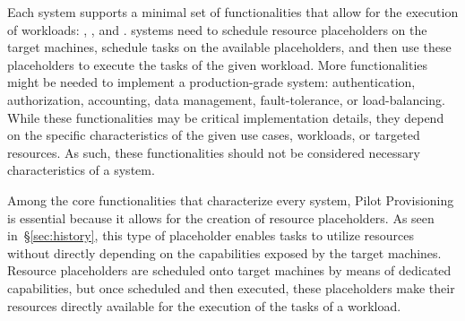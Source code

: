 \documentclass{sig-alternate}
\begin{document}
Each \pilotjob system supports a minimal set of functionalities that allow for
the execution of workloads: , , and . \pilotjob systems need to schedule
resource placeholders on the target machines, schedule tasks on the available
placeholders, and then use these placeholders to execute the tasks of the given
workload. More functionalities might be needed to implement a production-grade
\pilotjob system: authentication, authorization, accounting, data management,
fault-tolerance, or load-balancing. While these functionalities may be critical
implementation details, they depend on the specific characteristics of the given
use cases, workloads, or targeted resources. As such, these functionalities
should not be considered necessary characteristics of a \pilotjob system.

Among the core functionalities that characterize every \pilotjob system, Pilot
Provisioning is essential because it allows for the creation of resource
placeholders. As seen in~\S\ref{sec:history}, this type of placeholder enables
tasks to utilize resources without directly depending on the capabilities
exposed by the target machines. Resource placeholders are scheduled onto target
machines by means of dedicated capabilities, but once scheduled and then
executed, these placeholders make their resources directly available for the
execution of the tasks of a workload.



\end{document}
